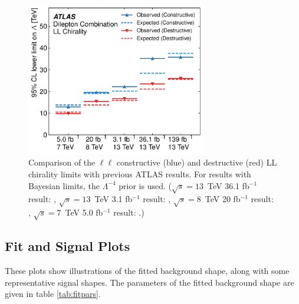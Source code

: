 \begin{figure}[!htpb]
\centering
\includegraphics[width=0.70\textwidth]{figures/ci/results/figaux_05.pdf}
\caption{Comparison of the $\ell\ell$ constructive (blue) and destructive (red) LL chirality limits with previous ATLAS results. For results with Bayesian limits, the $\Lambda^{-4}$ prior is used. ($\sqrt{s}=13$~TeV 36.1 fb$^{-1}$ result: \cite{EXOT-2016-05}, $\sqrt{s}=13$~TeV 3.1 fb$^{-1}$ result: \cite{EXOT-2015-07}, $\sqrt{s}=8$~TeV 20 fb$^{-1}$ result: \cite{EXOT-2013-19}, $\sqrt{s}=7$~TeV 5.0 fb$^{-1}$ result: \cite{EXOT-2012-17}.)}
\label{fig:ciCiHistoricalLimits}
\end{figure}


\subsection{Fit and Signal Plots}

These plots show illustrations of the fitted background shape, along with some representative signal shapes. The parameters of the fitted background shape are given in table \ref{tab:fitpars}.

